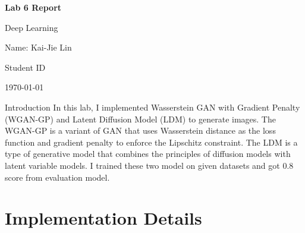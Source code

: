\documentclass{article} %
\newcommand{\question}[2][]{\begin{flushleft}\textbf{Question #1}: \textit{#2}\end{flushleft}}
\newcommand{\maketitletwo}[2][]{\begin{center}
        \Large{\textbf{Lab 6 Report}
        
            Deep Learning} %
        \vspace{5pt}
        
        \normalsize{
            Name: Kai-Jie Lin 
            
            Student ID\: 110652019
            
            \today}
        \vspace{15pt}
        \end{center}}
\begin{document}
    \maketitletwo[5]  %

    \section{Introduction}
    In this lab, I implemented Wasserstein GAN with Gradient Penalty (WGAN-GP) and Latent Diffusion Model (LDM) to generate images. 
    The WGAN-GP is a variant of GAN that uses Wasserstein distance as the loss function and gradient penalty to enforce the Lipschitz constraint. 
    The LDM is a type of generative model that combines the principles of diffusion models with latent variable models.
    I trained these two model on given datasets and got 0.8 score from evaluation model.
    
    \section{Implementation Details}
\end{document}
